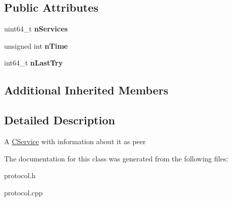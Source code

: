 \subsection*{Public Attributes}
\begin{DoxyCompactItemize}
\item 
\mbox{\label{class_c_address_a6a4a6aa020d0d558f238c7d04dd986c3}} 
uint64\+\_\+t {\bfseries n\+Services}
\item 
\mbox{\label{class_c_address_ac1c44aac968b11f90ce529b133ae4e9b}} 
unsigned int {\bfseries n\+Time}
\item 
\mbox{\label{class_c_address_abcf198429efe135fa2424f7dbc0048b0}} 
int64\+\_\+t {\bfseries n\+Last\+Try}
\end{DoxyCompactItemize}
\subsection*{Additional Inherited Members}


\subsection{Detailed Description}
A \mbox{\hyperlink{class_c_service}{C\+Service}} with information about it as peer 

The documentation for this class was generated from the following files\+:\begin{DoxyCompactItemize}
\item 
protocol.\+h\item 
protocol.\+cpp\end{DoxyCompactItemize}
